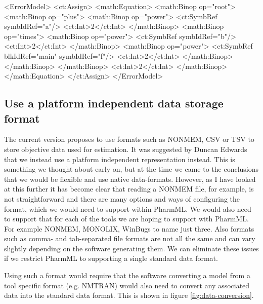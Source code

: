 \documentclass[a4paper,10pt]{article}
\newcommand{\pharmml}{PharmML\xspace}
\begin{document}
\begin{xmlcode}
<ErrorModel>
    <ct:Assign>
        <math:Equation>
            <math:Binop op="root">
                <math:Binop op="plus">
                    <math:Binop op="power">
                        <ct:SymbRef symbIdRef="a"/>
                        <ct:Int>2</ct:Int>
                    </math:Binop>
                    <math:Binop op="times">
                        <math:Binop op="power">
                            <ct:SymbRef symbIdRef="b"/>
                            <ct:Int>2</ct:Int>
                        </math:Binop>
                        <math:Binop op="power">
                            <ct:SymbRef blkIdRef="main" symbIdRef="f"/>
                            <ct:Int>2</ct:Int>
                        </math:Binop>
                    </math:Binop>
                </math:Binop>
                <ct:Int>2</ct:Int>
            </math:Binop>
        </math:Equation>
    </ct:Assign>
</ErrorModel>
\end{xmlcode}

\subsection{Use a platform independent data storage format}

The current version proposes to use formats such as NONMEM, CSV or TSV
to store objective data used for estimation. It was suggested by
Duncan Edwards that we instead use a platform independent
representation instead. This is something we thought about early on,
but at the time we came to the conclusions that we would be flexible
and use native data-formats. However, as I have looked at this
further it has become clear that reading a NONMEM file, for example,
is not straightforward and there are many options and ways of
configuring the format, which we would need to support within
\pharmml. We would also need to support that for each of the tools we
are hoping to support with \pharmml. For example NONMEM, MONOLIX,
WinBugs to name just three. Also formats such as comma- and
tab-separated file formats are not all the same and can vary slightly
depending on the software generating them. We can eliminate these
issues if we restrict \pharmml to supporting a single standard data
format.

Using such a format would require that the software converting a model
from a tool specific format (e.g. NMTRAN) would also need to convert
any associated data into the standard data format. This is shown in
figure \ref{fig:data-conversion}.
\end{document}
